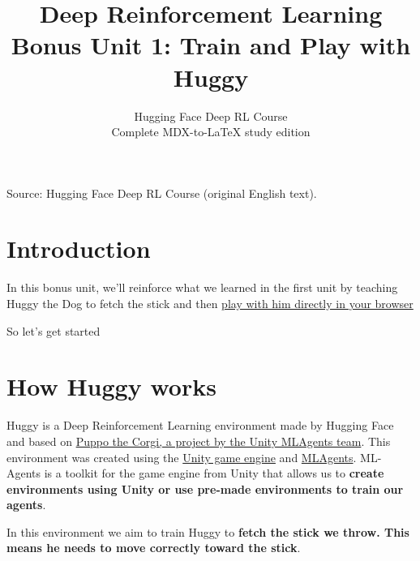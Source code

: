 \documentclass[11pt,a4paper]{article}
\title{\textbf{Deep Reinforcement Learning}\\[0.35em]\large Bonus Unit 1: Train and Play with Huggy}
\author{Hugging Face Deep RL Course\\\small Complete MDX-to-\LaTeX{} study edition}
\date{}
\begin{document}
\maketitle
\vspace{-0.7em}
\begin{center}\small\color{secondary}Source: Hugging Face Deep RL Course (original English text).\end{center}
\begingroup\small\setlength{\parskip}{0pt}\tableofcontents\endgroup
\vspace{0.5em}
\clearpage

\section{Introduction}\label{introduction}

In this bonus unit, we'll reinforce what we learned in the first unit by teaching Huggy the Dog to fetch the stick and then \href{https://huggingface.co/spaces/ThomasSimonini/Huggy}{play with him directly in your browser}


So let's get started

\section{How Huggy works}\label{how-huggy-works}

Huggy is a Deep Reinforcement Learning environment made by Hugging Face and based on \href{https://blog.unity.com/technology/puppo-the-corgi-cuteness-overload-with-the-unity-ml-agents-toolkit}{Puppo the Corgi, a project by the Unity MLAgents team}. This environment was created using the \href{https://unity.com/}{Unity game engine} and \href{https://github.com/Unity-Technologies/ml-agents}{MLAgents}. ML-Agents is a toolkit for the game engine from Unity that allows us to \textbf{create environments using Unity or use pre-made environments to train our agents}.


In this environment we aim to train Huggy to \textbf{fetch the stick we throw. This means he needs to move correctly toward the stick}.
\end{document}
